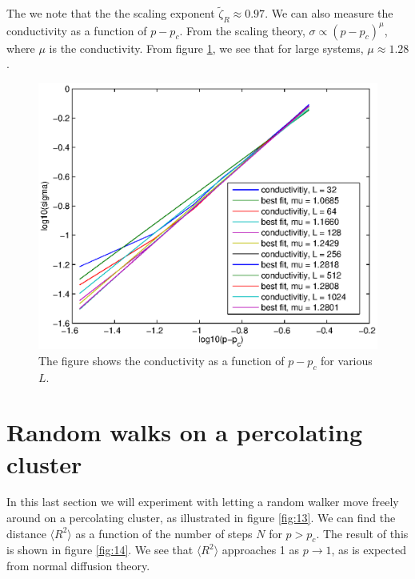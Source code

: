\documentclass[12pt]{article}
\begin{document}
 The we note that the the scaling exponent $\tilde{\zeta}_R \approx 0.97$. We can also measure the conductivity as a function of $p-p_c$. From the scaling theory, $\sigma \propto (p-p_c)^\mu$, where $\mu$ is the conductivity. From figure \ref{fig:mp}, we see that for large systems, $\mu \approx 1.28$.
 

 \begin{figure}[ht]
\centering

	\includegraphics[width=13cm]{muofp.eps}


\caption[Optional caption for list of figures]{The figure shows the conductivity as a function of $p-p_c$ for various $L$.}
\label{fig:mp}
\end{figure}



\clearpage
\section{Random walks on a percolating cluster}
In this last section we will experiment with letting a random walker move freely around on a percolating cluster, as illustrated in figure \ref{fig:13}. We can find the distance $\langle R^2 \rangle$ as a function of the number of steps $N$ for $p>p_c$. The result of this is shown in figure \ref{fig:14}. We see that $\langle R^2 \rangle $ approaches 1 as $p \rightarrow 1$, as is expected from normal diffusion theory. 
\end{document}
